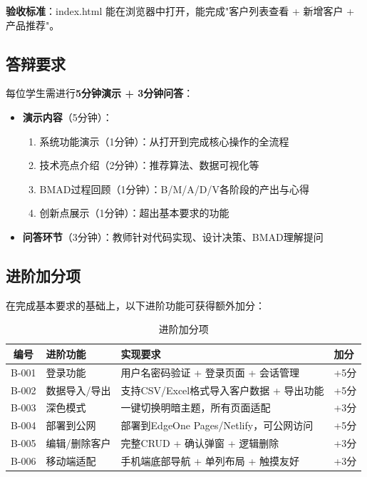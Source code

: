 \textbf{验收标准}：index.html 能在浏览器中打开，能完成"客户列表查看 + 新增客户 + 产品推荐"。

\subsection{答辩要求}

每位学生需进行\textbf{5分钟演示 + 3分钟问答}：

\begin{itemize}[leftmargin=2em]
  \item \textbf{演示内容}（5分钟）：
  \begin{enumerate}[leftmargin=2em]
    \item 系统功能演示（1分钟）：从打开到完成核心操作的全流程
    \item 技术亮点介绍（2分钟）：推荐算法、数据可视化等
    \item BMAD过程回顾（1分钟）：B/M/A/D/V各阶段的产出与心得
    \item 创新点展示（1分钟）：超出基本要求的功能
  \end{enumerate}
  \item \textbf{问答环节}（3分钟）：教师针对代码实现、设计决策、BMAD理解提问
\end{itemize}

\subsection{进阶加分项}

在完成基本要求的基础上，以下进阶功能可获得额外加分：

\begin{table}[H]
\centering
\begin{tabular}{clp{6cm}l}
\toprule
\textbf{编号} & \textbf{进阶功能} & \textbf{实现要求} & \textbf{加分} \\
\midrule
B-001 & 登录功能 & 用户名密码验证 + 登录页面 + 会话管理 & +5分 \\
B-002 & 数据导入/导出 & 支持CSV/Excel格式导入客户数据 + 导出功能 & +5分 \\
B-003 & 深色模式 & 一键切换明暗主题，所有页面适配 & +3分 \\
B-004 & 部署到公网 & 部署到EdgeOne Pages/Netlify，可公网访问 & +5分 \\
B-005 & 编辑/删除客户 & 完整CRUD + 确认弹窗 + 逻辑删除 & +3分 \\
B-006 & 移动端适配 & 手机端底部导航 + 单列布局 + 触摸友好 & +3分 \\
\bottomrule
\end{tabular}
\caption{进阶加分项}
\end{table}

